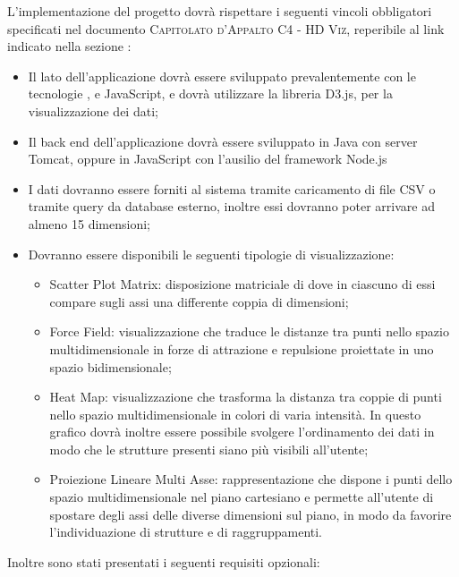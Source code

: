 \documentclass[../analisi-dei-requisiti.tex]{subfiles}
\begin{document}
L'implementazione del progetto dovrà rispettare i seguenti vincoli obbligatori specificati nel documento
\textsc{Capitolato d'Appalto C4 - HD Viz}, reperibile al link indicato nella sezione :
\begin{itemize}
  \item Il lato  dell'applicazione dovrà essere sviluppato prevalentemente con le tecnologie
        ,  e JavaScript, e dovrà utilizzare la libreria D3.js, per la
        visualizzazione dei dati;
  \item Il back end dell'applicazione dovrà essere sviluppato in Java con server Tomcat,
        oppure in JavaScript con l'ausilio del framework Node.js
  \item I dati dovranno essere forniti al sistema tramite caricamento di file CSV o tramite query da database
        esterno, inoltre essi dovranno poter arrivare ad almeno 15 dimensioni;
  \item Dovranno essere disponibili le seguenti tipologie di visualizzazione:
        \begin{itemize}
          \item Scatter Plot Matrix: disposizione matriciale di  dove in ciascuno di essi compare
                sugli assi una differente coppia di dimensioni;
          \item Force Field: visualizzazione che traduce le distanze tra punti nello spazio multidimensionale in forze
                di attrazione e repulsione proiettate in uno spazio bidimensionale;
          \item Heat Map: visualizzazione che trasforma la distanza tra coppie di punti nello spazio multidimensionale in
                colori di varia intensità. In questo grafico dovrà inoltre essere possibile svolgere l'ordinamento dei dati in
                modo che le strutture presenti siano più visibili all'utente;
          \item Proiezione Lineare Multi Asse: rappresentazione che dispone i punti dello spazio multidimensionale nel
                piano cartesiano e permette all'utente di spostare degli assi delle diverse dimensioni sul piano, in modo da
                favorire l'individuazione di strutture e di raggruppamenti.
        \end{itemize}
\end{itemize}
Inoltre sono stati presentati i seguenti requisiti opzionali:
\end{document}

